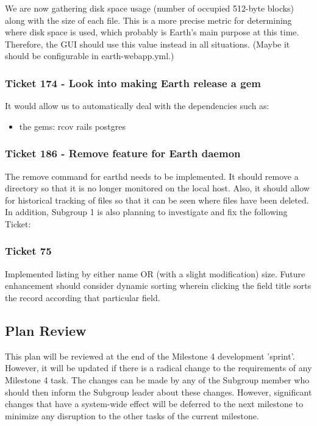 \documentclass[10pt,a4,oneside]{article}
\begin{document}
\noindent We are now gathering disk space usage (number of occupied 512-byte blocks) 
along with the size of each file. This is a more precise metric for 
determining where disk space is used, which probably is Earth's main purpose at this time. 
Therefore, the GUI should use this value instead in all situations. (Maybe it should be 
configurable in earth-webapp.yml.) 

\subsubsection*{ Ticket 174 - Look into making Earth release a gem}

\noindent It would allow us to automatically deal with the dependencies such as:

\begin{itemize}
\item the gems:
  \subitem rcov
  \subitem rails
  \subitem postgres 
\end{itemize}
 
\subsubsection*{ Ticket 186 - Remove feature for Earth daemon}

\noindent The remove command for earthd needs to be implemented. It should 
remove a directory so that it is no longer monitored on the local host. Also, 
it should allow for historical tracking of files so that it can be seen where 
files have been deleted. \\

\noindent In addition, Subgroup 1 is also planning to investigate and fix the following Ticket:

\subsubsection*{ Ticket 75}
\noindent Implemented listing by either name OR (with a slight modification) size.
Future enhancement should consider dynamic sorting wherein clicking the 
field title sorts the record according that particular field.


\subsection{Plan Review}
 
\noindent This plan will be reviewed at the end of the Milestone 4 development 'sprint'. However,
it will be updated if there is a radical change to the requirements of any Milestone 4 task. 
The changes can be made by any of the Subgroup member who should then inform the Subgroup leader 
about these changes. However, significant changes that have a system-wide effect will be deferred 
to the next milestone to minimize any disruption to the other tasks of the current milestone.
\end{document}
